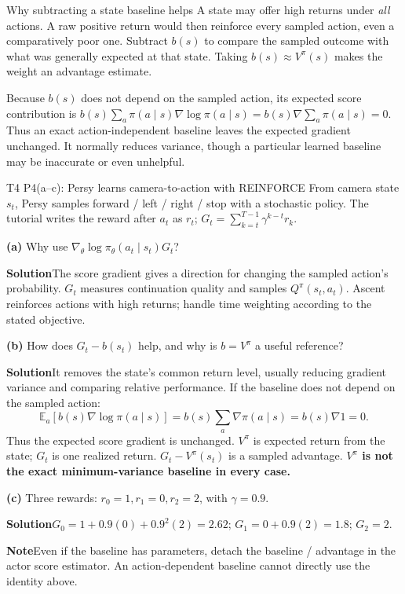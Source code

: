 \documentclass[10pt,a4paper]{article}
\newcommand{\ans}{\par\smallskip\textbf{\color{good}Solution\quad}}
\newcommand{\pit}{\par\smallskip\textbf{\color{warn}Note\quad}}
\newcommand{\E}{\mathbb E}
\begin{document}
\begin{card}{Why subtracting a state baseline helps}
A state may offer high returns under \emph{all} actions. A raw positive return would then reinforce every sampled action, even a comparatively poor one. Subtract $b(s)$ to compare the sampled outcome with what was generally expected at that state. Taking $b(s)\approx V^\pi(s)$ makes the weight an advantage estimate.

Because $b(s)$ does not depend on the sampled action, its expected score contribution is $b(s)\sum_a\pi(a\mid s)\nabla\log\pi(a\mid s)=b(s)\nabla\sum_a\pi(a\mid s)=0$. Thus an exact action-independent baseline leaves the expected gradient unchanged. It normally reduces variance, though a particular learned baseline may be inaccurate or even unhelpful.
\end{card}
\begin{question}{T4 P4(a--c): Persy learns camera-to-action with REINFORCE}\label{q:t4p4}
From camera state $s_t$, Persy samples forward / left / right / stop with a stochastic policy. The tutorial writes the reward after $a_t$ as $r_t$; $G_t=\sum_{k=t}^{T-1}\gamma^{k-t}r_k$.

\textbf{(a)} Why use $\nabla_\theta\log\pi_\theta(a_t\mid s_t)G_t$?
\ans The score gradient gives a direction for changing the sampled action's probability. $G_t$ measures continuation quality and samples $Q^\pi(s_t,a_t)$. Ascent reinforces actions with high returns; handle time weighting according to the stated objective.

\textbf{(b)} How does $G_t-b(s_t)$ help, and why is $b=V^\pi$ a useful reference?
\ans It removes the state's common return level, usually reducing gradient variance and comparing relative performance. If the baseline does not depend on the sampled action:
\[
\E_a[b(s)\nabla\log\pi(a\mid s)]
=b(s)\sum_a\nabla\pi(a\mid s)=b(s)\nabla1=0.
\]
Thus the expected score gradient is unchanged. $V^\pi$ is expected return from the state; $G_t$ is one realized return. $G_t-V^\pi(s_t)$ is a sampled advantage. \textbf{$V^\pi$ is not the exact minimum-variance baseline in every case.}

\textbf{(c)} Three rewards: $r_0=1,r_1=0,r_2=2$, with $\gamma=0.9$.
\ans $\boxed{G_0=1+0.9(0)+0.9^2(2)=2.62}$; $\boxed{G_1=0+0.9(2)=1.8}$; $G_2=2$.
\pit Even if the baseline has parameters, detach the baseline / advantage in the actor score estimator. An action-dependent baseline cannot directly use the identity above.
\end{question}
\end{document}

